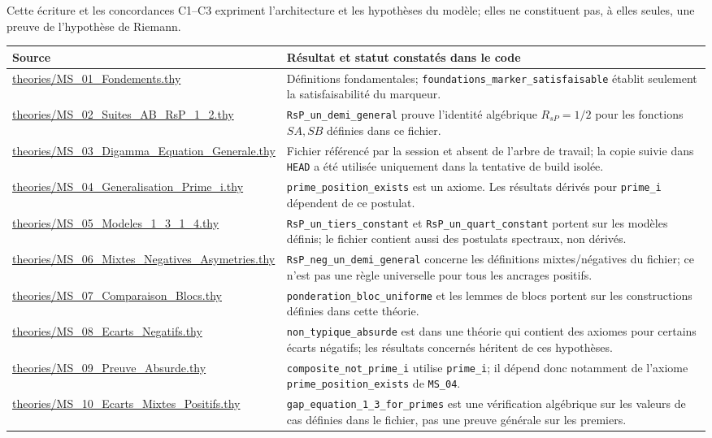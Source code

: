 \documentclass[11pt,a4paper]{article}
\begin{document}
Cette écriture et les concordances C1--C3 expriment l'architecture et les
hypothèses du modèle; elles ne constituent pas, à elles seules, une preuve de
l'hypothèse de Riemann.

\small
\begin{longtable}{@{}p{} p{}@{}}
\toprule
\rowcolor{spectralgris}
Source & Résultat et statut constatés dans le code \\
\midrule
\url{theories/MS\_01\_Fondements.thy} & Définitions fondamentales; \texttt{foundations\_marker\_satisfaisable} établit seulement la satisfaisabilité du marqueur. \\
\url{theories/MS\_02\_Suites\_AB\_RsP\_1\_2.thy} & \texttt{RsP\_un\_demi\_general} prouve l'identité algébrique $R_{sP}=1/2$ pour les fonctions $SA,SB$ définies dans ce fichier. \\
\url{theories/MS\_03\_Digamma\_Equation\_Generale.thy} & Fichier référencé par la session et absent de l'arbre de travail; la copie suivie dans \texttt{HEAD} a été utilisée uniquement dans la tentative de build isolée. \\
\url{theories/MS\_04\_Generalisation\_Prime\_i.thy} & \texttt{prime\_position\_exists} est un axiome. Les résultats dérivés pour \texttt{prime\_i} dépendent de ce postulat. \\
\url{theories/MS\_05\_Modeles\_1\_3\_1\_4.thy} & \texttt{RsP\_un\_tiers\_constant} et \texttt{RsP\_un\_quart\_constant} portent sur les modèles définis; le fichier contient aussi des postulats spectraux, non dérivés. \\
\url{theories/MS\_06\_Mixtes\_Negatives\_Asymetries.thy} & \texttt{RsP\_neg\_un\_demi\_general} concerne les définitions mixtes/négatives du fichier; ce n'est pas une règle universelle pour tous les ancrages positifs. \\
\url{theories/MS\_07\_Comparaison\_Blocs.thy} & \texttt{ponderation\_bloc\_uniforme} et les lemmes de blocs portent sur les constructions définies dans cette théorie. \\
\url{theories/MS\_08\_Ecarts\_Negatifs.thy} & \texttt{non\_typique\_absurde} est dans une théorie qui contient des axiomes pour certains écarts négatifs; les résultats concernés héritent de ces hypothèses. \\
\url{theories/MS\_09\_Preuve\_Absurde.thy} & \texttt{composite\_not\_prime\_i} utilise \texttt{prime\_i}; il dépend donc notamment de l'axiome \texttt{prime\_position\_exists} de \texttt{MS\_04}. \\
\url{theories/MS\_10\_Ecarts\_Mixtes\_Positifs.thy} & \texttt{gap\_equation\_1\_3\_for\_primes} est une vérification algébrique sur les valeurs de cas définies dans le fichier, pas une preuve générale sur les premiers. \\

\end{longtable}
\end{document}
